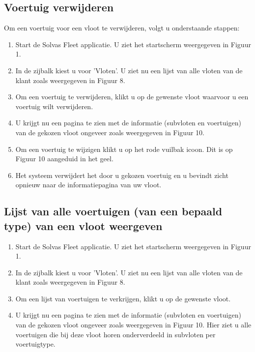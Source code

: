 \documentclass[11pt,openany]{article}
\begin{document}
\subsection{Voertuig verwijderen}
Om een voertuig voor een vloot te verwijderen, volgt u onderstaande stappen:
\begin{enumerate}
	\item Start de Solvas Fleet applicatie. U ziet het startscherm weergegeven in Figuur 1.
	\item In de zijbalk kiest u voor 'Vloten'. U ziet nu een lijst van alle vloten van de klant zoals weergegeven in Figuur 8.
	\item Om een voertuig te verwijderen, klikt u op de gewenste vloot waarvoor u een voertuig wilt verwijderen. 
	\item U krijgt nu een pagina te zien met de informatie (subvloten en voertuigen) van de gekozen vloot
	ongeveer zoals weergegeven in Figuur 10. 
	\item Om een voertuig te wijzigen klikt u op het rode vuilbak icoon. Dit is op Figuur 10 aangeduid in het geel.
	\item Het systeem verwijdert het door u gekozen voertuig en u bevindt zicht opnieuw naar de informatiepagina van uw vloot.
\end{enumerate}


\subsection{Lijst van alle voertuigen (van een bepaald type) van een vloot weergeven}
\begin{enumerate}
	\item Start de Solvas Fleet applicatie. U ziet het startscherm weergegeven in Figuur 1.
	\item In de zijbalk kiest u voor 'Vloten'. U ziet nu een lijst van alle vloten van de klant zoals weergegeven in Figuur 8.
	\item Om een lijst van voertuigen te verkrijgen, klikt u op de gewenste vloot.
	\item U krijgt nu een pagina te zien met de informatie (subvloten en voertuigen) van de gekozen vloot
	ongeveer zoals weergegeven in Figuur 10. Hier ziet u alle voertuigen die bij deze vloot horen onderverdeeld in subvloten per voertuigtype.
\end{enumerate}
\end{document}
